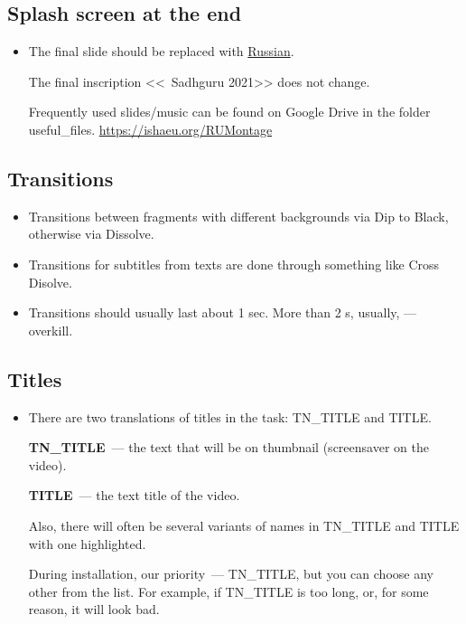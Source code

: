 \documentclass[
a4paper, %
12pt, %
article,
onecolumn, %
openany, %
]{memoir}
\begin{document}
\subsection{Splash screen at the end}

\begin{itemize}
\item The final slide should be replaced
with \href{https://drive.google.com/file/d/11NbSgvq8LbxDcy-a2WY5OJTKUZKcZx88/view?usp=sharing }{Russian}.

The final inscription <<\textcopyright\ Sadhguru 2021>> does not change.

Frequently used slides/music can be found on Google Drive in the folder
useful\_files.
\href{https://ishaeu.org/RUMontage}{https://ishaeu.org/RUMontage}
\end{itemize}


\subsection{Transitions}
\begin{itemize}
\item Transitions between fragments with different backgrounds via Dip to Black, otherwise via Dissolve.
\item Transitions for subtitles from texts are done through something like Cross Disolve.
\item Transitions should usually last about 1 sec.
More than 2 s, usually, --- overkill.
\end{itemize}

\subsection{Titles}
\begin{itemize}
\item There are two translations of titles in the task:
TN\_TITLE and TITLE.

\textbf{TN\_TITLE}~--- the text that will be on
thumbnail (screensaver on the video).

\textbf{TITLE}~--- the text title of the video.

Also, there will often be several variants of names
in TN\_TITLE and TITLE with one highlighted.

During installation, our
priority~--- TN\_TITLE, but you can choose any other
from the list. For example, if TN\_TITLE is too long,
or, for some reason, it will look bad.
\end{itemize}
\end{document}

